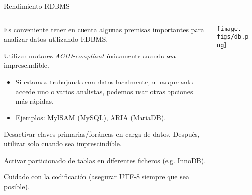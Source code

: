\begin{frame}{Rendimiento RDBMS}
 \begin{columns}[T]
    \begin{column}{.8\textwidth}
    \begin{wideitemize}
    \item Es conveniente tener en cuenta algunas premisas importantes para
    analizar datos utilizando RDBMS.
    
    \item Utilizar motores \textit{ACID-compliant} únicamente cuando sea
    imprescindible.
    \begin{itemize}
     \item Si estamos trabajando con datos localmente, a los que solo accede uno o
     varios analistas, podemos usar otras opciones más rápidas.
     
     \item Ejemplos: MyISAM (MySQL), ARIA (MariaDB).
     
    \end{itemize}
    
  \item Desactivar claves primarias/foráneas en carga de datos. Después, utilizar
     solo cuando sea imprescindible.
     
  \item Activar particionado de tablas en diferentes ficheros (e.g. InnoDB).
  
  \item Cuidado con la codificación (asegurar UTF-8 siempre que sea posible).

  \end{wideitemize}
    \end{column}
    \begin{column}{.2\textwidth}
    \vspace*{1.5cm}
    \texttt{[image: figs/db.png]}
    \end{column}
  \end{columns}

\end{frame}


